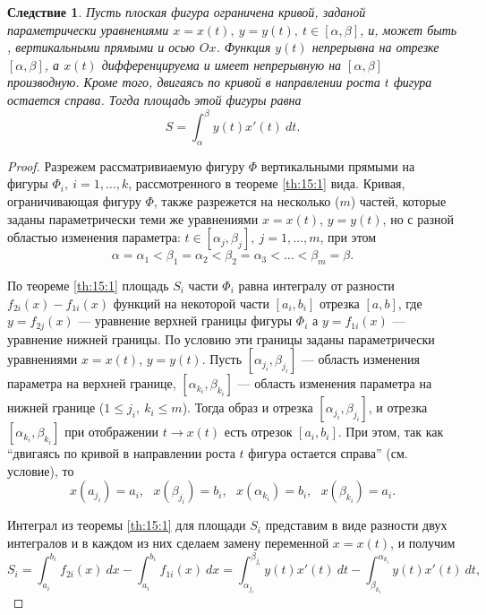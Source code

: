 \documentclass[12pt]{report}
\numberwithin{equation}{section}
\newtheorem{remark}{Следствие}[section]
\begin{document}
\begin{remark} \label {rem:15:1}
Пусть плоская фигура ограничена кривой, заданой параметрически уравнениями $x = x(t),~y = y(t),~t \in [\alpha, \beta]$, и, может быть , вертикальными прямыми и осью $Ox$. Функция $y(t)$ непрерывна на отрезке $[\alpha, \beta]$, а $x(t)$ дифференцируема и имеет непрерывную на $[\alpha, \beta]$ производную. Кроме того, двигаясь по кривой в направлении роста $t$ фигура остается справа. Тогда площадь этой фигуры равна
\[ S = \int_{\alpha}^{\beta} y(t) x'(t)~dt.\]
\end{remark}

\begin{proof}
Разрежем рассматривиаемую фигуру $\Phi$ вертикальными прямыми на фигуры $\Phi_i,~i = 1,\ldots, k$, рассмотренного в теореме \ref{th:15:1} вида. Кривая, ограничивающая фигуру $\Phi$, также разрежется на несколько ($m$) частей, которые заданы параметрически теми же уравнениями $x = x(t)$, $y = y(t)$, но с разной областью изменения параметра: $t \in [\alpha_j, \beta_j],~j = 1,\ldots, m$, при этом
\[\alpha = \alpha_1 < \beta_1 = \alpha_2 < \beta_2 = \alpha_3  < \ldots < \beta_m = \beta. \]

По теореме \ref{th:15:1} площадь $S_i$ части $\Phi_i$ равна интегралу от разности $f_{2i}(x) - f_{1i}(x)$ функций на некоторой части $[a_i, b_i]$ отрезка $[a, b]$, где $y = f_{2j}(x)$ --- уравнение верхней границы фигуры $\Phi_i$ а $y = f_{1i}(x)$ --- уравнение нижней границы. По условию эти границы заданы параметрически уравнениями $x = x(t)$, $y = y(t)$. Пусть $[\alpha_{j_i}, \beta_{j_i}]$ --- область изменения параметра на верхней границе, $[\alpha_{k_i}, \beta_{k_i}]$ --- область изменения параметра на нижней границе ($1 \leqslant j_i,~k_i \leqslant m$). Тогда образ и отрезка $[\alpha_{j_i}, \beta_{j_i}]$, и отрезка $[\alpha_{k_i}, \beta_{k_i}]$ при отображении $t \to x(t)$ есть отрезок $[a_i, b_i]$. При этом, так как ``двигаясь по кривой в направлении роста $t$ фигура остается справа'' (см. условие), то
\begin{equation} \label{eq:15:1}
x(a_{j_i}) = a_i,~~~x(\beta_{j_i}) = b_i,~~~x(\alpha_{k_i}) = b_i,~~~x(\beta_{k_i}) = a_i.
\end{equation}

Интеграл из теоремы \ref{th:15:1} для площади $S_i$ представим в виде разности двух интегралов и в каждом из них сделаем замену переменной $x = x(t)$, и получим
\[ S_i = \int_{a_i}^{b_i} f_{2i} (x) ~dx - \int_{a_i}^{b_i} f_{1i}(x)~dx = \int_{\alpha_{j_i}}^{\beta_{j_i}} y(t) x'(t)~dt - \int_{\beta_{k_i}}^{\alpha_{k_i}} y(t) x'(t)~dt,\]


\end{proof}
\end{document}

